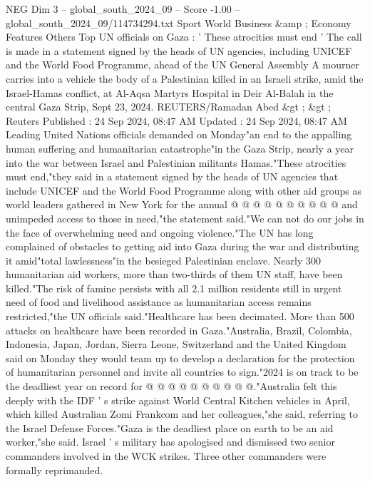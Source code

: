 \begin{textsample}{NEG Dim 3 – global\_south\_2024\_09 – Score -1.00 – global\_south\_2024\_09/114734294.txt}  \label{ex:f3_neg_128}
Sport World Business \&amp ; Economy Features Others Top UN officials on Gaza : ' These atrocities must end ' The call is made in a statement signed by the heads of UN agencies, including UNICEF and the World Food Programme, ahead of the UN General Assembly A mourner carries into a vehicle the body of a Palestinian killed in an Israeli strike, amid the Israel-Hamas conflict, at Al-Aqsa Martyrs Hospital in Deir Al-Balah in the central Gaza Strip, Sept 23, 2024.
REUTERS/Ramadan Abed \&gt ; \&gt ; Reuters Published : 24 Sep 2024, 08:47 AM Updated : 24 Sep 2024, 08:47 AM Leading United Nations officials demanded on Monday"an end to the appalling human suffering and humanitarian catastrophe"in the Gaza Strip, nearly a year into the war between Israel and Palestinian militants Hamas."These atrocities must end,"they said in a statement signed by the heads of UN agencies that include UNICEF and the World Food Programme along with other aid groups as world leaders gathered in New York for the annual @ @ @ @ @ @ @ @ @ @ and unimpeded access to those in need,"the statement said."We can not do our jobs in the face of overwhelming need and ongoing violence."The UN has long complained of obstacles to getting aid into Gaza during the war and distributing it amid"total lawlessness"in the besieged Palestinian enclave.
Nearly 300 humanitarian aid workers, more than two-thirds of them UN staff, have been killed."The risk of famine persists with all 2.1 million residents still in urgent need of food and livelihood assistance as humanitarian access remains restricted,"the UN officials said."Healthcare has been decimated.
More than 500 attacks on healthcare have been recorded in Gaza."Australia, Brazil, Colombia, Indonesia, Japan, Jordan, Sierra Leone, Switzerland and the United Kingdom said on Monday they would team up to develop a declaration for the protection of humanitarian personnel and invite all countries to sign."2024 is on track to be the deadliest year on record for @ @ @ @ @ @ @ @ @ @."Australia felt this deeply with the IDF ' s strike against World Central Kitchen vehicles in April, which killed Australian Zomi Frankcom and her colleagues,"she said, referring to the Israel Defense Forces."Gaza is the deadliest place on earth to be an aid worker,"she said.
Israel ' s military has apologised and dismissed two senior commanders involved in the WCK strikes.
Three other commanders were formally reprimanded.

\end{textsample}
